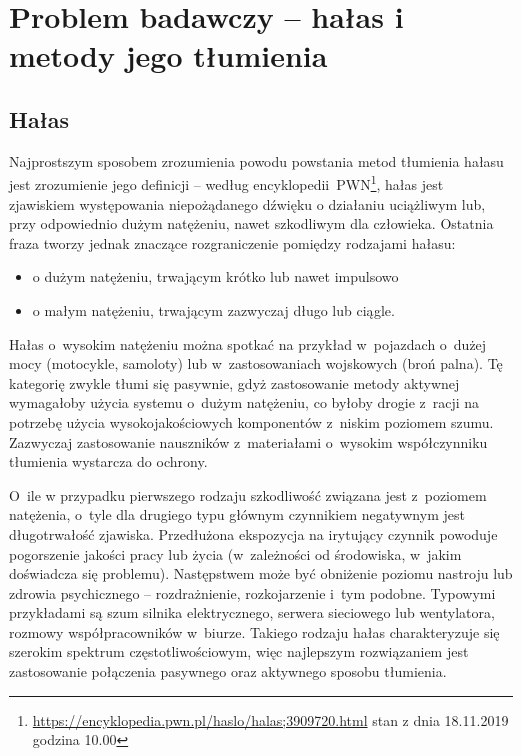 \chapter{Problem badawczy -- hałas i metody jego tłumienia}
\label{cha:teoria}

\section{Hałas}
\label{sec:hałas}
Najprostszym sposobem zrozumienia powodu powstania metod tłumienia hałasu jest zrozumienie jego definicji -- według encyklopedii~PWN\footnote{\url{https://encyklopedia.pwn.pl/haslo/halas;3909720.html} stan z dnia 18.11.2019 godzina 10.00}, hałas jest zjawiskiem występowania niepożądanego dźwięku o działaniu uciążliwym lub, przy odpowiednio dużym natężeniu, nawet szkodliwym dla człowieka. Ostatnia fraza tworzy jednak znaczące rozgraniczenie pomiędzy rodzajami hałasu:
\begin{itemize}
	\item o dużym natężeniu, trwającym krótko lub nawet impulsowo
	\item o małym natężeniu, trwającym zazwyczaj długo lub ciągle.
\end{itemize}
Hałas o~wysokim natężeniu można spotkać na przykład w~pojazdach o~dużej mocy (motocykle, samoloty) lub w~zastosowaniach wojskowych (broń palna). Tę kategorię zwykle tłumi się pasywnie, gdyż zastosowanie metody aktywnej wymagałoby użycia systemu o~dużym natężeniu, co byłoby drogie z~racji na potrzebę użycia wysokojakościowych komponentów z~niskim poziomem szumu. Zazwyczaj zastosowanie nauszników z~materiałami o~wysokim współczynniku tłumienia%
 wystarcza do ochrony.

O~ile w przypadku pierwszego rodzaju szkodliwość związana jest z~poziomem natężenia, o~tyle dla drugiego typu głównym czynnikiem negatywnym jest długotrwałość zjawiska. Przedłużona ekspozycja na irytujący czynnik powoduje pogorszenie jakości pracy lub życia (w~zależności od środowiska, w~jakim doświadcza się problemu). Następstwem może być obniżenie poziomu nastroju lub zdrowia psychicznego -- rozdrażnienie, rozkojarzenie i~tym podobne. Typowymi przykładami są szum silnika elektrycznego, serwera sieciowego lub wentylatora, rozmowy współpracowników w~biurze. Takiego rodzaju hałas charakteryzuje się szerokim spektrum częstotliwościowym, więc najlepszym rozwiązaniem jest zastosowanie połączenia pasywnego oraz aktywnego sposobu tłumienia. 
